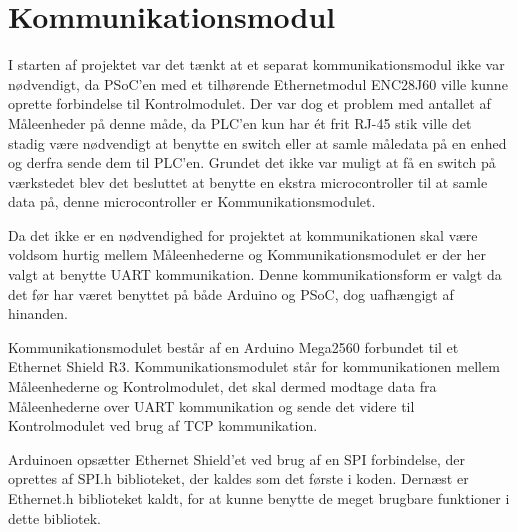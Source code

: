 
\section{Kommunikationsmodul}
\label{Kommunikationsmodul}

I starten af projektet var det tænkt at et separat kommunikationsmodul ikke var nødvendigt, da PSoC'en med et tilhørende Ethernetmodul ENC28J60 ville kunne oprette forbindelse til Kontrolmodulet. Der var dog et problem med antallet af Måleenheder på denne måde, da PLC'en kun har ét frit RJ-45 stik ville det stadig være nødvendigt at benytte en switch eller at samle måledata på en enhed og derfra sende dem til PLC'en. Grundet det ikke var muligt at få en switch på værkstedet blev det besluttet at benytte en ekstra microcontroller til at samle data på, denne microcontroller er Kommunikationsmodulet.   

Da det ikke er en nødvendighed for projektet at kommunikationen skal være voldsom hurtig mellem Måleenhederne og Kommunikationsmodulet er der her valgt at benytte UART kommunikation. Denne kommunikationsform er valgt da det før har været benyttet på både Arduino og PSoC, dog uafhængigt af hinanden.


Kommunikationsmodulet består af en Arduino Mega2560 forbundet til et Ethernet Shield R3. Kommunikationsmodulet står for kommunikationen mellem Måleenhederne og Kontrolmodulet, det skal dermed modtage data fra Måleenhederne over UART kommunikation og sende det videre til Kontrolmodulet ved brug af TCP kommunikation. 

Arduinoen opsætter Ethernet Shield'et ved brug af en SPI forbindelse, der oprettes af SPI.h biblioteket, der kaldes som det første i koden. Dernæst er Ethernet.h biblioteket kaldt, for at kunne benytte de meget brugbare funktioner i dette bibliotek. 
